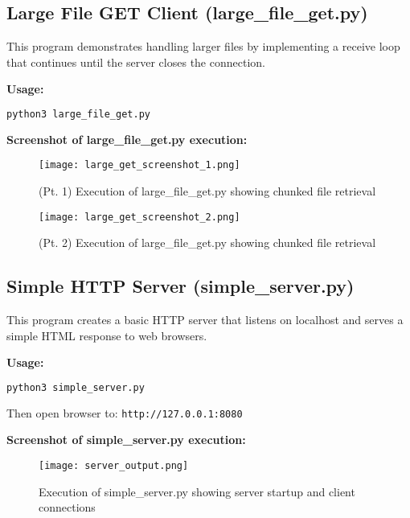 \documentclass[12pt]{article}
\begin{document}
\subsection{Large File GET Client (large\_file\_get.py)}

This program demonstrates handling larger files by implementing a receive loop that continues until the server closes the connection.

\textbf{Usage:}
\begin{lstlisting}[language=bash]
python3 large_file_get.py
\end{lstlisting}

\textbf{Screenshot of large\_file\_get.py execution:}

\begin{figure}[H]
    \centering
    \texttt{[image: large\_get\_screenshot\_1.png]}
    \caption{(Pt. 1) Execution of large\_file\_get.py showing chunked file retrieval}
    \label{fig:large_get_1}
\end{figure}

\begin{figure}[H]
    \centering
    \texttt{[image: large\_get\_screenshot\_2.png]}
    \caption{(Pt. 2) Execution of large\_file\_get.py showing chunked file retrieval}
    \label{fig:large_get_2}
\end{figure}

\subsection{Simple HTTP Server (simple\_server.py)}

This program creates a basic HTTP server that listens on localhost and serves a simple HTML response to web browsers.

\textbf{Usage:}
\begin{lstlisting}[language=bash]
python3 simple_server.py
\end{lstlisting}

Then open browser to: \texttt{http://127.0.0.1:8080}

\textbf{Screenshot of simple\_server.py execution:}

\begin{figure}[H]
    \centering
    \texttt{[image: server\_output.png]}
    \caption{Execution of simple\_server.py showing server startup and client connections}
    \label{fig:server_terminal}
\end{figure}
\end{document}

